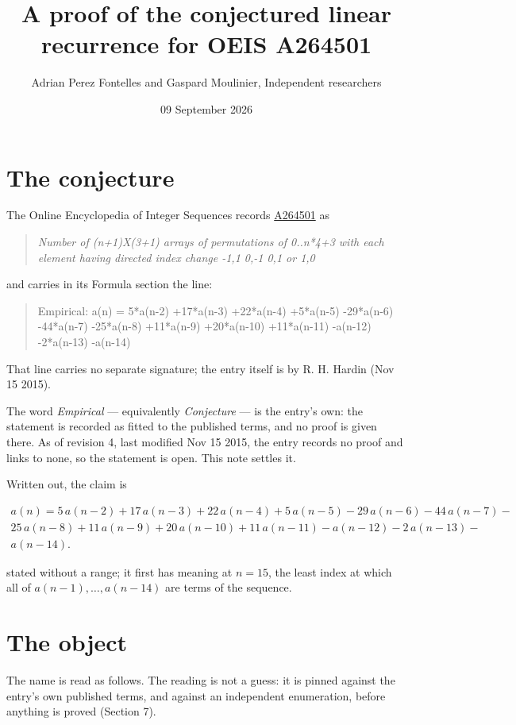 \documentclass[11pt]{article}
\title{A proof of the conjectured linear recurrence for OEIS A264501}
\author{Adrian Perez Fontelles and Gaspard Moulinier, Independent researchers}
\date{09 September 2026}
\theoremstyle{definition}
\begin{document}
\maketitle
\section{The conjecture}

The Online Encyclopedia of Integer Sequences records \href{https://oeis.org/A264501}{A264501} as

\begin{quote}\itshape Number of (n+1)X(3+1) arrays of permutations of 0..n*4+3 with each element having directed index change -1,1 0,-1 0,1 or 1,0\end{quote}

and carries in its Formula section the line:

\begin{quote}\ttfamily Empirical: a(n) = 5*a(n-2) +17*a(n-3) +22*a(n-4) +5*a(n-5) -29*a(n-6) -44*a(n-7) -25*a(n-8) +11*a(n-9) +20*a(n-10) +11*a(n-11) -a(n-12) -2*a(n-13) -a(n-14)\end{quote}

That line carries no separate signature; the entry itself is by R. H. Hardin (Nov 15 2015).

The word {\itshape Empirical} --- equivalently {\itshape Conjecture} --- is the entry's own: the statement is recorded as fitted to the published terms, and no proof is given there. As of revision 4, last modified Nov 15 2015, the entry records no proof and links to none, so the statement is open. This note settles it.

Written out, the claim is

\begin{multline*} a(n) = 5\,a(n-2) + 17\,a(n-3) + 22\,a(n-4) + 5\,a(n-5) - 29\,a(n-6) - 44\,a(n-7) - \\ 25\,a(n-8) + 11\,a(n-9) + 20\,a(n-10) + 11\,a(n-11) - a(n-12) - 2\,a(n-13) - \\ a(n-14). \end{multline*}

stated without a range; it first has meaning at $n = 15$, the least index at which all of $a(n-1),\dots,a(n-14)$ are terms of the sequence.

\section{The object}

The name is read as follows. The reading is not a guess: it is pinned against the entry's own published terms, and against an independent enumeration, before anything is proved (Section 7).
\end{document}
